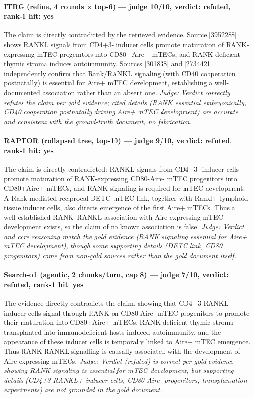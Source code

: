 \documentclass[sigconf, review, anonymous]{acmart}
\begin{document}
\paragraph{ITRG (refine, 4 rounds $\times$ top-6) --- judge 10/10, verdict: refuted, rank-1 hit: yes}
\noindent The claim is directly contradicted by the retrieved evidence. Source [3952288] shows RANKL signals from CD4+3- inducer cells promote maturation of RANK-expressing mTEC progenitors into CD80+Aire+ mTECs, and RANK-deficient thymic stroma induces autoimmunity. Sources [301838] and [2734421] independently confirm that Rank/RANKL signaling (with CD40 cooperation postnatally) is essential for Aire+ mTEC development, establishing a well-documented association rather than an absent one.
\noindent\small\textit{Judge: Verdict correctly refutes the claim per gold evidence; cited details (RANK essential embryonically, CD40 cooperation postnatally driving Aire+ mTEC development) are accurate and consistent with the ground-truth document, no fabrication.}
\paragraph{RAPTOR (collapsed tree, top-10) --- judge 9/10, verdict: refuted, rank-1 hit: yes}
\noindent The claim is directly contradicted: RANKL signals from CD4+3- inducer cells promote maturation of RANK-expressing CD80-Aire- mTEC progenitors into CD80+Aire+ mTECs, and RANK signaling is required for mTEC development. A Rank-mediated reciprocal DETC--mTEC link, together with Rankl+ lymphoid tissue inducer cells, also directs emergence of the first Aire+ mTECs. Thus a well-established RANK--RANKL association with Aire-expressing mTEC development exists, so the claim of no known association is false.
\noindent\small\textit{Judge: Verdict and core reasoning match the gold evidence (RANK signaling essential for Aire+ mTEC development), though some supporting details (DETC link, CD80 progenitors) come from non-gold sources rather than the gold document itself.}
\paragraph{Search-o1 (agentic, 2 chunks/turn, cap 8) --- judge 7/10, verdict: refuted, rank-1 hit: yes}
\noindent The evidence directly contradicts the claim, showing that CD4+3-RANKL+ inducer cells signal through RANK on CD80-Aire- mTEC progenitors to promote their maturation into CD80+Aire+ mTECs. RANK-deficient thymic stroma transplanted into immunodeficient hosts induced autoimmunity, and the appearance of these inducer cells is temporally linked to Aire+ mTEC emergence. Thus RANK-RANKL signalling is causally associated with the development of Aire-expressing mTECs.
\noindent\small\textit{Judge: Verdict (refuted) is correct per gold evidence showing RANK signaling is essential for mTEC development, but supporting details (CD4+3-RANKL+ inducer cells, CD80-Aire- progenitors, transplantation experiments) are not grounded in the gold document.}
\end{document}
